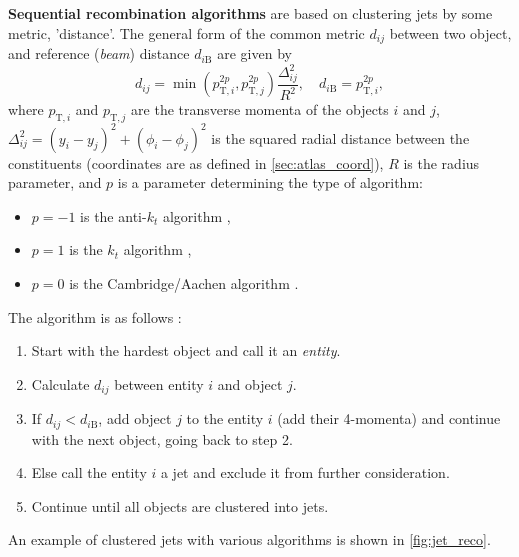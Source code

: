 \textbf{Sequential recombination algorithms} are based on clustering jets by some metric, 'distance'.
The general form of the common metric $d_{ij}$ between two object, and reference (\emph{beam}) distance $d_{i\text{B}}$ are given by \cite{antikt}
\begin{equation}
    \label{eq:kt_distance}
    d_{ij} = \min{(p_{\text{T}, i}^{2p}, p_{\text{T}, j}^{2p})} \frac{\Delta^2_{ij}}{R^2}, \quad d_{i\text{B}} = p_{\text{T}, i}^{2p},
\end{equation}
where $p_{\text{T}, i}$ and $p_{\text{T}, j}$ are the transverse momenta of the objects $i$ and $j$, $\Delta^2_{ij} = (y_i - y_j)^2 + (\phi_i - \phi_j)^2$ is the squared radial distance between the constituents (coordinates are as defined in \cref{sec:atlas_coord}), $R$ is the radius parameter, and $p$ is a parameter determining the type of algorithm:
\begin{itemize}
    \item $p=-1$ is the anti-$k_t$ \footnotemark algorithm \cite{antikt},
    \item $p=1$ is the $k_t$ \footnotemark algorithm \cite{kt},
    \item $p=0$ is the Cambridge/Aachen algorithm \cite{Cam_Aachen_alg}.
\end{itemize}
The algorithm is as follows \cite{antikt}:
\begin{enumerate}
    \item Start with the hardest object and call it an \emph{entity}.
    \item Calculate $d_{ij}$ between entity $i$ and object $j$.
    \item If $d_{ij} < d_{i\text{B}}$, add object $j$ to the entity $i$ (add their 4-momenta) and continue with the next object, going back to step 2.
    \item Else call the entity $i$ a jet and exclude it from further consideration.
    \item Continue until all objects are clustered into jets.
\end{enumerate}
An example of clustered jets with various algorithms is shown in \cref{fig:jet_reco}.
